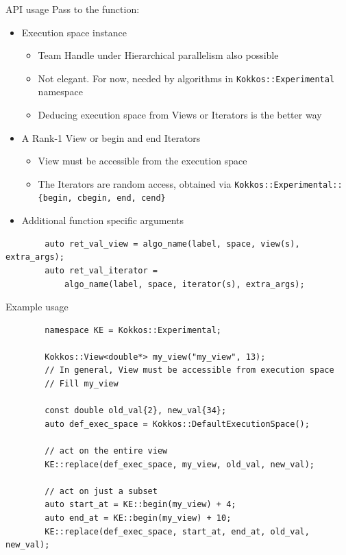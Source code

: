 \documentclass[
    aspectratio=169,
    \createHandout
]{beamer}
\begin{document}
\begin{frame}[fragile]{API usage}
    Pass to the function:
    \begin{itemize}
        \item Execution space instance
        \begin{itemize}
            \item Team Handle under Hierarchical parallelism also possible
            \item Not elegant. For now, needed by algorithms in \texttt{Kokkos::Experimental} namespace
            \item Deducing execution space from Views or Iterators is the better way
        \end{itemize}
        \item A Rank-1 View or begin and end Iterators
        \begin{itemize}
            \item View must be accessible from the execution space
            \item The Iterators are random access, obtained via \texttt{Kokkos::Experimental::\{begin, cbegin, end, cend\}}
        \end{itemize}
        \item Additional function specific arguments
    \end{itemize}
    \begin{verbatim}
        auto ret_val_view = algo_name(label, space, view(s), extra_args);
        auto ret_val_iterator =
            algo_name(label, space, iterator(s), extra_args);
    \end{verbatim}
\end{frame}

\begin{frame}[fragile]{Example usage}
    \begin{verbatim}
        namespace KE = Kokkos::Experimental;

        Kokkos::View<double*> my_view("my_view", 13);
        // In general, View must be accessible from execution space
        // Fill my_view

        const double old_val{2}, new_val{34};
        auto def_exec_space = Kokkos::DefaultExecutionSpace();

        // act on the entire view
        KE::replace(def_exec_space, my_view, old_val, new_val);

        // act on just a subset
        auto start_at = KE::begin(my_view) + 4;
        auto end_at = KE::begin(my_view) + 10;
        KE::replace(def_exec_space, start_at, end_at, old_val, new_val);
    \end{verbatim}
\end{frame}
\end{document}
